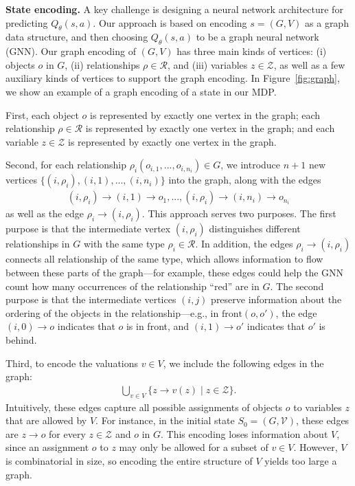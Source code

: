 \textbf{State encoding.}
%
A key challenge is designing a neural network architecture for predicting $Q_{\theta}(s,a)$. Our approach is based on encoding $s=(G,V)$ as a graph data structure, and then choosing $Q_{\theta}(s,a)$ to be a graph neural network (GNN). Our graph encoding of $(G,V)$ has three main kinds of vertices: (i) objects $o$ in $G$, (ii) relationships $\rho\in\mathcal{R}$, and (iii) variables $z\in\mathcal{Z}$, as well as a few auxiliary kinds of vertices to support the graph encoding. In Figure~\ref{fig:graph}, we show an example of a graph encoding of a state in our MDP.

First, each object $o$ is represented by exactly one vertex in the graph; each relationship $\rho\in\mathcal{R}$ is represented by exactly one vertex in the graph; and each variable $z\in\mathcal{Z}$ is represented by exactly one vertex in the graph.

Second, for each relationship $\rho_i(o_{i,1},...,o_{i,n_i})\in G$, we introduce $n+1$ new vertices $\{(i,\rho_i),(i,1),...,(i,n_i)\}$ into the graph, along with the edges
\begin{align*}
(i,\rho_i)\to(i,1)\to o_1,...,(i,\rho_i)\to(i,n_i)\to o_{n_i}
\end{align*}
as well as the edge $\rho_i\to(i,\rho_i)$. This approach serves two purposes. The first purpose is that the intermediate vertex $(i,\rho_i)$ distinguishes different relationships in $G$ with the same type $\rho_i\in\mathcal{R}$. In addition, the edges $\rho_i\to(i,\rho_i)$ connects all relationship of the same type, which allows information to flow between these parts of the graph---for example, these edges could help the GNN count how many occurrences of the relationship ``red'' are in $G$. The second purpose is that the intermediate vertices $(i,j)$ preserve information about the ordering of the objects in the relationship---e.g., in $\text{front}(o,o')$, the edge $(i,0)\to o$ indicates that $o$ is in front, and $(i,1)\to o'$ indicates that $o'$ is behind.

Third, to encode the valuations $v\in V$, we include the following edges in the graph:
\begin{align*}
\bigcup_{v\in V}\{z\to v(z)\mid z\in\mathcal{Z}\}.
\end{align*}
Intuitively, these edges capture all possible assignments of objects $o$ to variables $z$ that are allowed by $V$. For instance, in the initial state $S_0=(G,\mathcal{V})$, these edges are $z\to o$ for every $z\in\mathcal{Z}$ and $o$ in $G$. This encoding loses information about $V$, since an assignment $o$ to $z$ may only be allowed for a subset of $v\in V$. However, $V$ is combinatorial in size, so encoding the entire structure of $V$ yields too large a graph.

